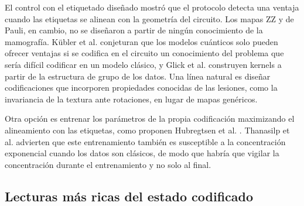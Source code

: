 El control con el etiquetado diseñado mostró que el protocolo detecta una ventaja cuando las etiquetas
se alinean con la geometría del circuito. Los mapas ZZ y de Pauli, en cambio, no se diseñaron a partir de
ningún conocimiento de la mamografía. Kübler et al. \cite{Kubler2021Inductive} conjeturan que los modelos
cuánticos solo pueden ofrecer ventajas si se codifica en el circuito un conocimiento del problema que
sería difícil codificar en un modelo clásico, y Glick et al. \cite{Glick2024Covariant} construyen kernels
a partir de la estructura de grupo de los datos. Una línea natural es diseñar codificaciones que
incorporen propiedades conocidas de las lesiones, como la invariancia de la textura ante rotaciones, en
lugar de mapas genéricos.

Otra opción es entrenar los parámetros de la propia codificación maximizando el alineamiento con las
etiquetas, como proponen Hubregtsen et al. \cite{Hubregtsen2022}. Thanasilp et al.
\cite{Thanasilp2024} advierten que este entrenamiento también es susceptible a la concentración
exponencial cuando los datos son clásicos, de modo que habría que vigilar la concentración durante el
entrenamiento y no solo al final.

\subsection{Lecturas más ricas del estado codificado}
\label{sec:futuro_lectura}

